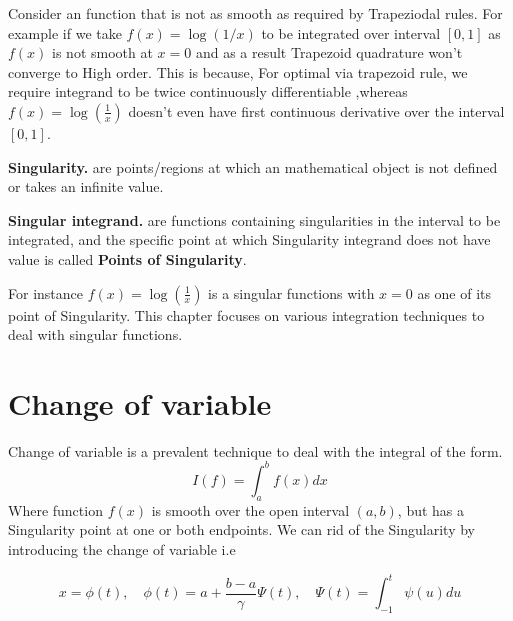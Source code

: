 \documentclass[../document.tex]{subfiles}
\begin{document}
	
	
	
	
	
	
	\nocite{atkinson2008introduction}
	\nocite{epperson2013introduction}
	Consider an function that is not as smooth as required by Trapeziodal rules. For example if we take $f(x) = \log(1/x)$ to be integrated over interval $[0,1]$ as $f(x)$ is not smooth at $x=0$ and as a result Trapezoid quadrature won't converge to High order. This is because, For optimal via trapezoid rule, we require integrand to be twice continuously differentiable \cite{epperson2013introduction} ,whereas $f(x) = \log(\frac{1}{x})$ doesn't even have first continuous derivative over the interval $[0,1]$.
	
	\begin{simp_num} {\normalfont\textbf{Singularity.}} are points/regions at which an mathematical object is not defined  or takes an infinite value. 
	\end{simp_num}
	
	\begin{simp_num} {\normalfont\textbf{Singular integrand.}} are functions containing singularities in the interval to be integrated, and the specific point at which Singularity integrand does not have value is called 
		{\normalfont\textbf{Points of Singularity}}.
	\end{simp_num}
	
	For instance  $f(x) = \log(\frac{1}{x})$ is a singular functions with 
	$x=0$ as one of its point of Singularity. 
	This chapter focuses on various integration techniques to deal with singular functions.
	
	\section{Change of variable}
	Change of variable \cite{atkinson2008introduction} is a prevalent technique to deal with the integral of the form. 
	$$
	I(f) = \int_{a}^{b} f(x)dx
	$$
	Where function $f(x)$ is smooth over the open interval $(a,b)$, but has a Singularity point at one or both endpoints. We can rid of the Singularity by introducing the change of variable i.e
	
	\begin{equation} \label{Change-of-variable}
		x =\phi(t) , \quad \phi(t) = a +\frac{b-a}{\gamma}\Psi(t) ,\quad \Psi(t) =\int_{-1}^{t}\psi(u)du
	\end{equation}
	
\end{document}
